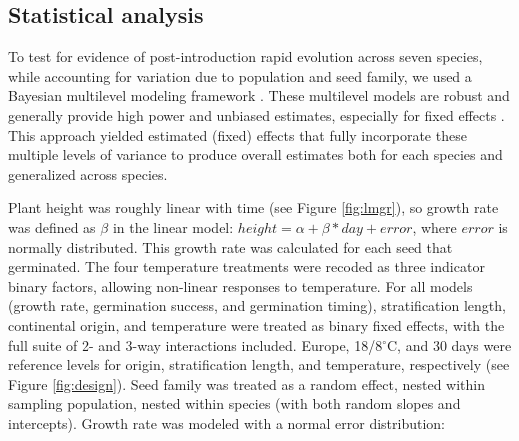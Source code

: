 \documentclass[11pt]{article}\usepackage[]{graphicx}\usepackage[]{color}
\begin{document}
	\subsection{Statistical analysis} 
	To test for evidence of post-introduction rapid evolution across seven species, while accounting for variation due to population and seed family, we used a Bayesian multilevel modeling framework \parencite{Carpenter2017}. These multilevel models are 
robust and generally provide high power and unbiased estimates, especially for fixed effects \parencite{Paccagnella2011}. This approach yielded estimated (fixed) effects that fully incorporate these multiple levels of variance to produce overall estimates both for each species and generalized across species. 

Plant height was roughly linear with time (see Figure \ref{fig:lmgr}), so growth rate was defined as $\beta$ in the linear model: $height = \alpha + \beta*day + error $, where $error$ is normally distributed. This growth rate was calculated for each seed that germinated. The four temperature treatments were recoded as three indicator binary factors, allowing non-linear responses to temperature. For all models (growth rate, germination success, and germination timing), stratification length, continental origin, and temperature were treated as binary fixed effects, with the full suite of 2- and 3-way interactions included. Europe, 18/8$^\circ$C, and 30 days were reference levels for origin, stratification length, and temperature, respectively (see Figure \ref{fig:design}). Seed family was treated as a random effect, nested within sampling population, nested within species (with both random slopes and intercepts). Growth rate was modeled with a normal error distribution: 
\end{document}
